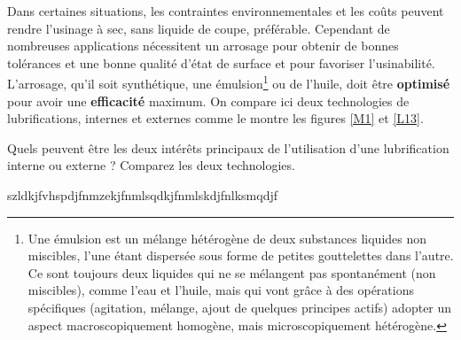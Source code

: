 \documentclass[12pt]{article}
\newcounter{exo}
\newenvironment{exo}{\stepcounter{exo}\vspace{0.5cm}{\bfseries Question \theexo\ :}}{\par\vspace{0.5cm}}
\begin{document}
Dans certaines situations, les contraintes environnementales et les coûts peuvent rendre l'usinage à sec, sans liquide de coupe, préférable. Cependant de nombreuses applications nécessitent un arrosage pour obtenir de bonnes tolérances et une bonne qualité d'état de surface et pour favoriser l'usinabilité. L'arrosage, qu'il soit synthétique, une émulsion\footnote{Une émulsion est un mélange hétérogène de deux substances liquides non miscibles, l'une étant dispersée sous forme de petites gouttelettes dans l'autre. Ce sont toujours deux liquides qui ne se mélangent pas spontanément (non miscibles), comme l’eau et l’huile, mais qui vont grâce à des opérations spécifiques (agitation, mélange, ajout de quelques principes actifs) adopter un aspect macroscopiquement homogène, mais microscopiquement hétérogène.} ou de l'huile, doit être \textbf{optimisé} pour avoir une \textbf{efficacité} maximum. On compare ici deux technologies de lubrifications, internes et externes comme le montre les figures \ref{M1} et \ref{L13}.


\begin{exo} Quels peuvent être les deux intérêts principaux de l'utilisation d'une lubrification interne ou externe ? Comparez les deux technologies.\end{exo}



\begin{tcolorbox}[colback=blue!5!white,colframe=red!75!black]
  \bcinfo szldkjfvhspdjfnmzekjfnmlsqdkjfnmlskdjfnlksmqdjf
\end{tcolorbox}
\end{document}
